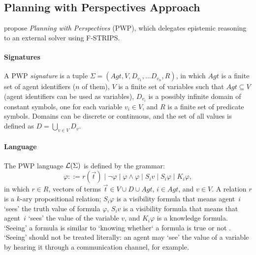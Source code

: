




\subsection{Planning with Perspectives Approach}
\label{sec:background:pwp_appraoch}

\citet{Hu2022-ul} propose \emph{Planning with Perspectives} (PWP), which delegates epistemic reasoning to an external solver using F-STRIPS.

\paragraph{Signatures}
A PWP \emph{signature} is a tuple $\Sigma = (Agt, V, D_{v_1}, \ldots D_{v_n}, R)$, in which $Agt$ is a finite set of agent identifiers ($n$ of them), $V$ is a finite set of variables such that $Agt \subseteq V$ (agent identifiers can be used as variables), $D_{v_i}$ is a possibly infinite domain of constant symbols, one for each variable $v_i \in V$, and $R$ is a finite set of predicate symbols. Domains can be discrete or continuous, and the set of all values is defined as $D = \bigcup_{v\in V} D_v$.

\paragraph{Language}
The PWP language $\mathcal{L}(\Sigma)$ is defined by the grammar:
\[
    \varphi ::= r(\Vec{t}) \mid \neg \varphi \mid \varphi \land \varphi \mid S_i v \mid S_i \varphi \mid K_i \varphi,
\]
in which $r \in R$, vectors of terms $\Vec{t} \in V \cup D \cup Agt$, $i \in Agt$, and $v \in V$. A relation $r$ is a $k$-ary propositional relation; $S_i \varphi$ is a visibility formula that means agent~$i$ `sees' the truth value of formula $\varphi$, $S_i v$ is a visibility formula that means that agent~$i$ `sees' the value of the variable $v$, and $K_i \varphi$ is a knowledge formula. `Seeing' a formula is similar to `knowing whether` a formula is true or not \cite{DBLP:journals/rsl/FanWD15,DBLP:conf/aaai/MillerFMPS16}. `Seeing' should not be treated literally: an agent may `see' the value of a variable by hearing it through a communication channel, for example.


